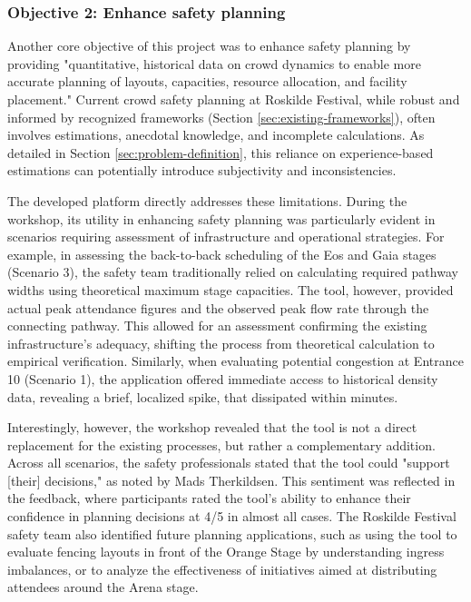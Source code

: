 \subsubsection{Objective 2: Enhance safety planning}

Another core objective of this project was to enhance safety planning by providing "quantitative, historical data on crowd dynamics to enable more accurate planning of layouts, capacities, resource allocation, and facility placement." Current crowd safety planning at Roskilde Festival, while robust and informed by recognized frameworks (Section \ref{sec:existing-frameworks}), often involves estimations, anecdotal knowledge, and incomplete calculations. As detailed in Section \ref{sec:problem-definition}, this reliance on experience-based estimations can potentially introduce subjectivity and inconsistencies.

The developed platform directly addresses these limitations. During the workshop, its utility in enhancing safety planning was particularly evident in scenarios requiring assessment of infrastructure and operational strategies. For example, in assessing the back-to-back scheduling of the Eos and Gaia stages (Scenario 3), the safety team traditionally relied on calculating required pathway widths using theoretical maximum stage capacities. The tool, however, provided actual peak attendance figures and the observed peak flow rate through the connecting pathway. This allowed for an assessment confirming the existing infrastructure's adequacy, shifting the process from theoretical calculation to empirical verification. Similarly, when evaluating potential congestion at Entrance 10 (Scenario 1), the application offered immediate access to historical density data, revealing a brief, localized spike, that dissipated within minutes.

Interestingly, however, the workshop revealed that the tool is not a direct replacement for the existing processes, but rather a complementary addition. Across all scenarios, the safety professionals stated that the tool could "support [their] decisions," as noted by Mads Therkildsen. This sentiment was reflected in the feedback, where participants rated the tool's ability to enhance their confidence in planning decisions at 4/5 in almost all cases. The Roskilde Festival safety team also identified future planning applications, such as using the tool to evaluate fencing layouts in front of the Orange Stage by understanding ingress imbalances, or to analyze the effectiveness of initiatives aimed at distributing attendees around the Arena stage.


